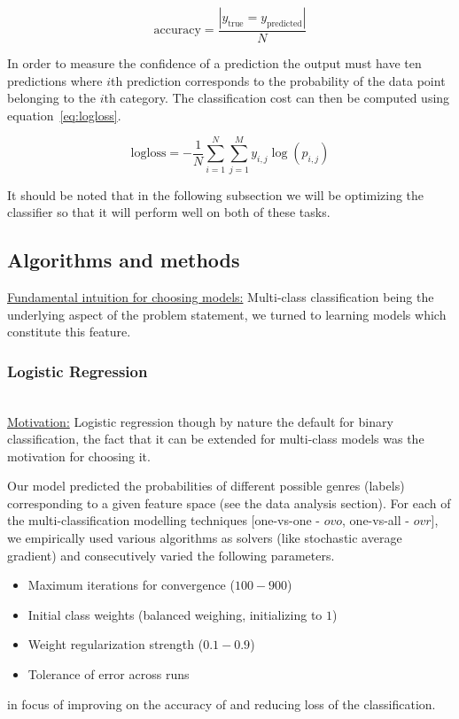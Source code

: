 \documentclass[fleqn,10pt]{SelfArx} %
\begin{document}
\begin{equation} \label{eq:accuracy}
  \text{accuracy} = \frac{| y_{\text{true}} = y_{\text{predicted}}|}{N}
\end{equation}

In order to measure the confidence of a prediction the output must have ten
predictions where $i$th prediction corresponds to the probability of the data
point belonging to the $i$th category. The classification cost can then be
computed using equation~\ref{eq:logloss}.

\begin{equation} \label{eq:logloss}
  \text{logloss} = - \frac{1}{N} \sum_{i=1}^N \sum_{j=1}^M y_{i, j} \log(p_{i, j})
\end{equation}

It should be noted that in the following subsection we will be optimizing the
classifier so that it will perform well on both of these tasks.

\subsection{Algorithms and methods}

\underline{Fundamental intuition for choosing models:} Multi-class classification being the underlying aspect of the problem statement, we turned to learning models which constitute this feature.

\subsubsection{Logistic Regression}~\\
\underline{Motivation:} Logistic regression though by nature the default for binary classification, the fact that it can be extended for multi-class models was the motivation for choosing it.

Our model predicted the probabilities of different possible genres (labels) corresponding to a given feature space (see the data analysis section). For each of the multi-classification modelling techniques [one-vs-one - $ovo$, one-vs-all - $ovr$], we empirically used various algorithms as solvers (like stochastic average gradient) and consecutively varied the following parameters.
\begin{itemize}
  \item Maximum iterations for convergence ($100-900$)
  \item Initial class weights (balanced weighing, initializing to $1$)
  \item Weight regularization strength ($0.1-0.9$)
  \item Tolerance of error across runs
\end{itemize}
in focus of improving on the accuracy of and reducing loss of the classification.
\end{document}
